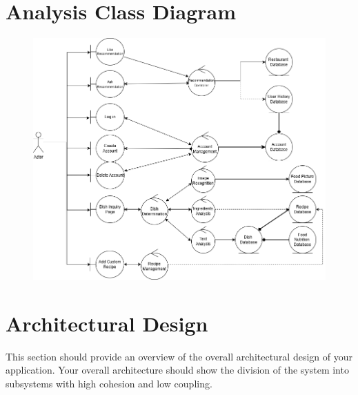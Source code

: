 \documentclass[]{article}
\begin{document}

\section{Analysis Class Diagram}
\label{sec:analysis_class_diagram}
\begin{figure}[H]
	\centering
   \includegraphics[width=\textwidth]{image/D2_2_analysis_class_diagram.png}
\end{figure}


\section{Architectural Design}
\label{sec:architectural_design}
This section should provide an overview of the overall architectural design of your application. Your overall architecture should show the division of the system into subsystems with high cohesion and low coupling.
\end{document}
